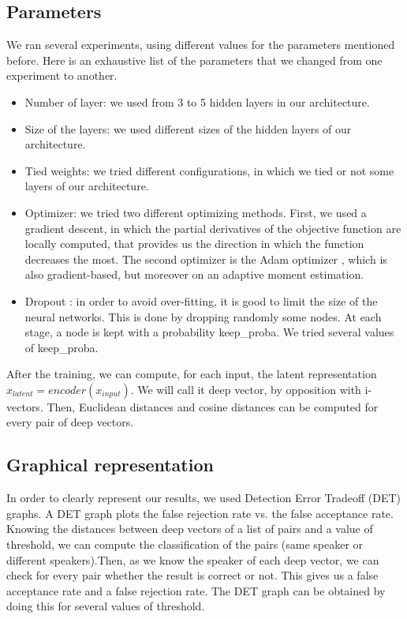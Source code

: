 \documentclass[conference]{IEEEtran}
\begin{document}
\subsection{Parameters}

We ran several experiments, using different values for the parameters mentioned before.
Here is an exhaustive list of the parameters that we changed from one experiment to another.

\begin{itemize}
\item{Number of layer}: we used from 3 to 5 hidden layers in our architecture.
\item{Size of the layers}: we used different sizes of the hidden layers of our architecture.
\item{Tied weights}: we tried different configurations, in which we tied or not some layers of our architecture.
\item{Optimizer}: we tried two different optimizing methods. First, we used a gradient descent, in which the partial derivatives of the objective function are locally computed, that provides us the direction in which the function decreases the most. The second optimizer is the Adam optimizer \cite{DBLP:journals/corr/KingmaB14}, which is also gradient-based, but moreover on an adaptive moment estimation.
\item{Dropout} \cite{Srivastava:2014:DSW:2627435.2670313}: in order to avoid over-fitting, it is good to limit the size of the neural networks. This is done by dropping randomly some nodes. At each stage, a node is kept with a probability keep\_proba. We tried several values of keep\_proba.
\end{itemize}

After the training, we can compute, for each input, the latent representation $x_{latent} = encoder(x_{input})$. We will call it deep vector, by opposition with i-vectors. Then, Euclidean distances and cosine distances can be computed for every pair of deep vectors.

\subsection{Graphical representation}

In order to clearly represent our results, we used Detection Error Tradeoff (DET) graphs. A DET graph plots the false rejection rate vs. the false acceptance rate. Knowing the distances between deep vectors of a list of pairs and a value of threshold, we can compute the classification of the pairs (same speaker or different speakers).Then, as we know the speaker of each deep vector, we can check for every pair whether the result is correct or not. This gives us a false acceptance rate and a false rejection rate. The DET graph can be obtained by doing this for several values of threshold.
\end{document}
